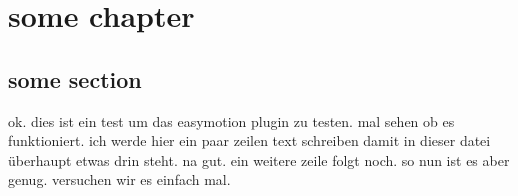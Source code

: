 \documentclass{}
\begin{document}
\chapter{some chapter}
\section{some section}
ok. dies ist ein test um das easymotion plugin zu testen. mal sehen ob es funktioniert. 
ich werde hier ein paar zeilen text schreiben damit in dieser datei überhaupt etwas drin steht.
na gut. ein weitere zeile folgt noch. so nun ist es aber genug.
versuchen wir es einfach mal. 
\end{document}
